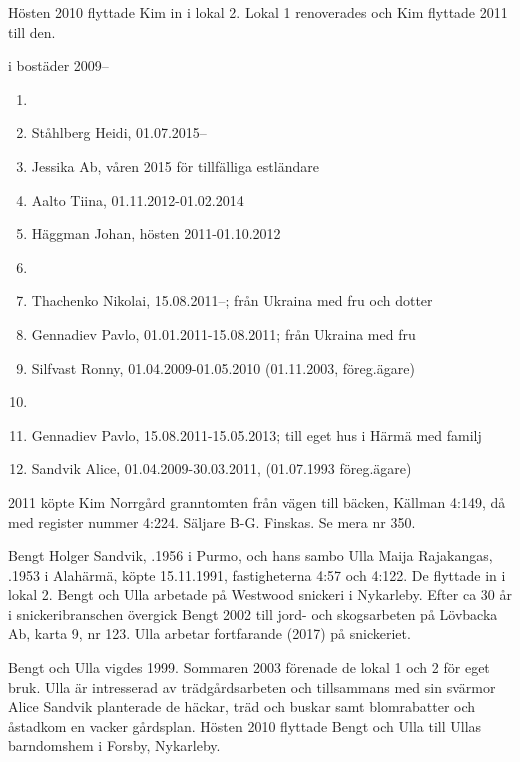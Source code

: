 Hösten 2010 flyttade Kim in i lokal 2. Lokal 1 renoverades och Kim flyttade 2011 till den.

 i bostäder 2009--
\begin{enumerate}
  \item {}
  \item Ståhlberg Heidi,	01.07.2015--
  \item Jessika Ab, våren 2015 för tillfälliga estländare
  \item Aalto Tiina, 01.11.2012-01.02.2014
  \item Häggman Johan,	hösten 2011-01.10.2012
  \item {}
  \item Thachenko Nikolai, 15.08.2011--; från Ukraina	med fru och dotter
  \item Gennadiev Pavlo,	01.01.2011-15.08.2011; från Ukraina	med fru
  \item Silfvast Ronny,	01.04.2009-01.05.2010 (01.11.2003, föreg.ägare)
  \item {}
  \item Gennadiev Pavlo, 15.08.2011-15.05.2013; till eget hus i Härmä med familj
  \item Sandvik Alice,	01.04.2009-30.03.2011, (01.07.1993 föreg.ägare)
\end{enumerate}

2011 köpte Kim Norrgård granntomten från vägen till bäcken, Källman 4:149, då med register nummer 4:224. Säljare  B-G. Finskas. Se mera nr 350.


Bengt Holger Sandvik, .1956 i Purmo, och hans 	sambo	Ulla Maija Rajakangas, .1953 i Alahärmä, köpte 15.11.1991, fastigheterna 4:57 och 4:122. De flyttade in i lokal 2.	Bengt och Ulla arbetade på Westwood snickeri i Nykarleby. Efter ca 30 år i snickeribranschen övergick Bengt 2002 till jord- och skogsarbeten på Lövbacka Ab, karta 9, nr 123. Ulla arbetar fortfarande (2017) på snickeriet.

Bengt och Ulla vigdes 1999. Sommaren 2003 förenade de lokal 1 och 2 för eget bruk. Ulla är intresserad av trädgårdsarbeten och tillsammans med sin svärmor Alice Sandvik planterade de häckar, träd och buskar samt blomrabatter och åstadkom en vacker gårdsplan. Hösten 2010 flyttade Bengt och Ulla till Ullas barndomshem i Forsby, Nykarleby.


